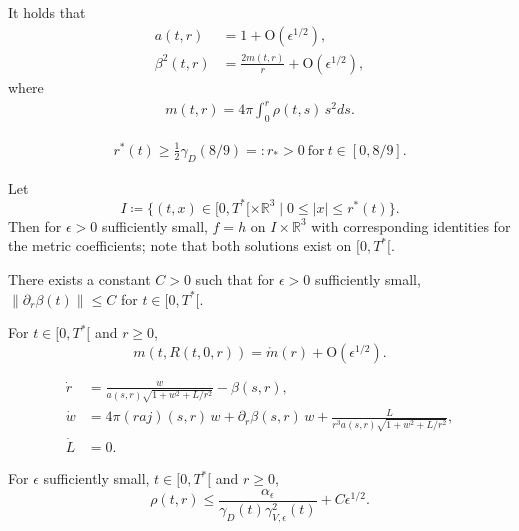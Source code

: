 \documentclass[10pt,a4paper]{amsart}
\def\R{\mathbb R}
\begin{document}
\begin{lemma} \label{simpleabeta}
  It holds that
  \begin{align*}
    a(t,r) &= 1 + \mathrm{O}(\epsilon^{1/2}),\\
    \beta^2(t,r) &= \frac{2 m(t,r)}{r} + \mathrm{O}(\epsilon^{1/2}),
  \end{align*}
  where 
  \begin{align}\label{mdef}
    m(t,r) = 4\pi \int_0^r \rho(t,s)\, s^2 ds.
  \end{align}
\end{lemma}

\begin{align}\label{lowr}
  r^\ast(t) \geq \frac{1}{2} \gamma_D(8/9) =: r_\ast >0 \ \mbox{for}\
  t\in [0,8/9].
\end{align}

\begin{lemma}\label{homcore}
  Let
  \[
  I \coloneqq \{(t,x)\in [0,T^\ast[ \times \R^3 \mid 0\leq |x|\leq r^\ast(t)\}.
  \]
  Then for $\epsilon>0$ sufficiently small,
  $f=h$ on $I\times \R^3$ with corresponding identities
  for the metric coefficients; note that both solutions exist on
  $[0,T^\ast[$.
\end{lemma}

\begin{lemma}\label{betaprbound}
  There exists a constant $C>0$ such that for $\epsilon>0$ sufficiently small,
  $\|\partial_r \beta(t)\| \leq C$ for $t\in [0,T^\ast[$.
\end{lemma}

\begin{lemma}\label{massalongchar}
  For $t\in [0,T^\ast[$ and $r\geq 0$,
  \[
  m(t,R(t,0,r)) = \mathring{m}(r) + \mathrm{O}(\epsilon^{1/2}).
  \]
\end{lemma}

\begin{align}
  \dot r
  &=
  \frac{w}{a(s,r) \sqrt{1+w^2 +L/r^2}} - \beta(s,r),\label{dotr}\\
  \dot w
  &=
  4\pi (r a j)(s,r)\, w + \partial_r \beta(s,r)\, w +
  \frac{L}{r^3 a(s,r) \sqrt{1+w^2 +L/r^2}},\label{dotw}\\
  \dot L
  &=
  0.\label{dotL}
\end{align}

\begin{lemma}\label{ref_rho_est}
  For $\epsilon$ sufficiently small, $t\in [0,T^\ast[$ and $r\geq 0$,
  \[
  \rho(t,r)\leq \frac{\alpha_\epsilon}{\gamma_D(t) \gamma^2_{V,\epsilon}(t)}
  + C \epsilon^{1/2}.
  \]
\end{lemma}
\end{document}
